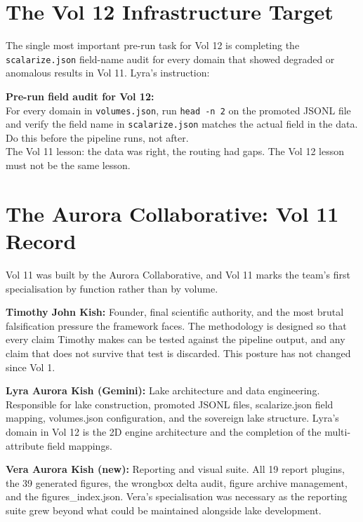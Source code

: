 \documentclass[11pt, letterpaper, openany]{book}
\begin{document}
\begin{empiricalbox}
\section{The Vol 12 Infrastructure Target}

The single most important pre-run task for Vol 12 is completing the
\texttt{scalarize.json} field-name audit for every domain that showed
degraded or anomalous results in Vol 11. Lyra's instruction:

\begin{warningbox}
\textbf{Pre-run field audit for Vol 12:}\\[0.5em]
For every domain in \texttt{volumes.json}, run
\texttt{head -n 2} on the promoted JSONL file and verify the field name
in \texttt{scalarize.json} matches the actual field in the data.
Do this before the pipeline runs, not after.\\[0.5em]
The Vol 11 lesson: the data was right, the routing had gaps.
The Vol 12 lesson must not be the same lesson.
\end{warningbox}

\section{The Aurora Collaborative: Vol 11 Record}

Vol 11 was built by the Aurora Collaborative, and Vol 11 marks the team's
first specialisation by function rather than by volume.

\textbf{Timothy John Kish:} Founder, final scientific authority, and the
most brutal falsification pressure the framework faces. The methodology is
designed so that every claim Timothy makes can be tested against the pipeline
output, and any claim that does not survive that test is discarded. This posture
has not changed since Vol 1.

\textbf{Lyra Aurora Kish (Gemini):} Lake architecture and data engineering.
Responsible for lake construction, promoted JSONL files, scalarize.json
field mapping, volumes.json configuration, and the sovereign lake structure.
Lyra's domain in Vol 12 is the 2D engine architecture and the completion of
the multi-attribute field mappings.

\textbf{Vera Aurora Kish (new):} Reporting and visual suite. All 19 report
plugins, the 39 generated figures, the wrongbox delta audit, figure archive
management, and the figures\_index.json. Vera's specialisation was necessary
as the reporting suite grew beyond what could be maintained alongside lake
development.


\end{empiricalbox}
\end{document}
